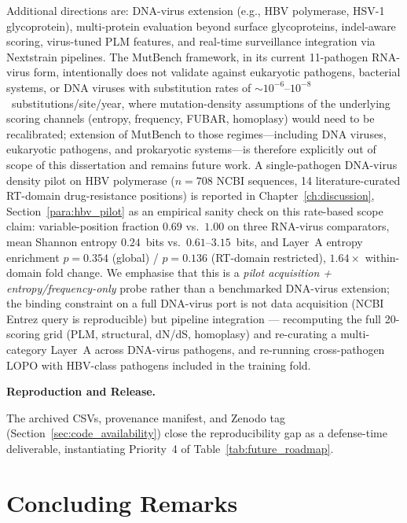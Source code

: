 Additional directions are: DNA-virus extension (e.g., HBV polymerase, HSV-1 glycoprotein), multi-protein evaluation beyond surface glycoproteins, indel-aware scoring, virus-tuned PLM features, and real-time surveillance integration via Nextstrain pipelines.
The MutBench framework, in its current 11-pathogen RNA-virus form, intentionally does not validate against eukaryotic pathogens, bacterial systems, or DNA viruses with substitution rates of ${\sim}10^{-6}$--$10^{-8}$~substitutions/site/year, where mutation-density assumptions of the underlying scoring channels (entropy, frequency, FUBAR, homoplasy) would need to be recalibrated; extension of MutBench to those regimes---including DNA viruses, eukaryotic pathogens, and prokaryotic systems---is therefore explicitly out of scope of this dissertation and remains future work.
A single-pathogen DNA-virus density pilot on HBV polymerase ($n = 708$ NCBI sequences, 14 literature-curated RT-domain drug-resistance positions) is reported in Chapter~\ref{ch:discussion}, Section~\ref{para:hbv_pilot} as an empirical sanity check on this rate-based scope claim: variable-position fraction $0.69$ vs.\ $1.00$ on three RNA-virus comparators, mean Shannon entropy $0.24$~bits vs.\ $0.61$--$3.15$~bits, and Layer~A entropy enrichment $p = 0.354$ (global) / $p = 0.136$ (RT-domain restricted), $1.64\times$ within-domain fold change. We emphasise that this is a \emph{pilot acquisition + entropy/frequency-only} probe rather than a benchmarked DNA-virus extension; the binding constraint on a full DNA-virus port is not data acquisition (NCBI Entrez query is reproducible) but pipeline integration --- recomputing the full 20-scoring grid (PLM, structural, dN/dS, homoplasy) and re-curating a multi-category Layer~A across DNA-virus pathogens, and re-running cross-pathogen LOPO with HBV-class pathogens included in the training fold.

\textbf{Reproduction and Release.}

The archived CSVs, provenance manifest, and Zenodo tag (Section~\ref{sec:code_availability}) close the reproducibility gap as a defense-time deliverable, instantiating Priority~4 of Table~\ref{tab:future_roadmap}.

\section{Concluding Remarks}
\label{sec:final_conclusion}

